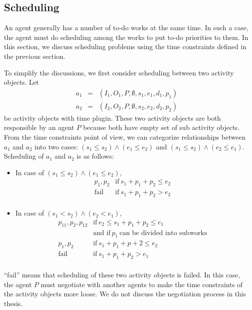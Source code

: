 \subsection{Scheduling}
\label{sec:scheduling}

An agent generally has a number of to-do works at the same time.  In
such a case, the agent must do scheduling among the works to put to-do
priorities to them.  In this section, we discuss scheduling problems
using the time constraints defined in the previous section.

To simplify the discussions, we first consider scheduling between two
activity objects.  Let
\begin{eqnarray*}
 a_1 & = & (I_1, O_1, P, \emptyset, s_1, e_1, d_1, p_1)\\
 a_2 & = & (I_2, O_2, P, \emptyset, s_2, e_2, d_2, p_2)
\end{eqnarray*}
be activity objects with time plugin.  These two activity objects are
both responsible by an agent $P$ because both have empty set of sub
activity objects.  From the time constraints point of view, we can
categorize relationships between $a_1$ and $a_2$ into two cases: $(s_1 \leq
s_2) \wedge (e_1 \leq e_2)$ and $(s_1 \leq s_2) \wedge (e_2 \leq e_1)$.
Scheduling of $a_1$ and $a_2$ is as follows:
\begin{itemize}
 \item In case of $(s_1 \leq s_2) \wedge (e_1 \leq e_2)$, 
       \[
	\begin{array}{ll}
	 p_1, p_2 & \mbox{if}\ s_1 + p_1 + p_2 \leq e_2 \\
	 \mbox{fail} & \mbox{if}\ s_1 + p_1 +p_2 > e_2 \\
	\end{array}
       \]
 \item In case of $(s_1 < s_2) \wedge (e_2 < e_1)$,
       \[
        \begin{array}{ll}
	 p_{11}, p_2, p_{12} & \mbox{if}\ e_2 \leq s_1 + p_1 + p_2 \leq e_1 \\
	 & \mbox{and if}\ p_1\ \mbox{can be divided into subworks}\\
	 p_1, p_2 & \mbox{if}\ s_1 + p_1 + p+2 \leq e_2\\
	 \mbox{fail} & \mbox{if}\ s_1 + p_1 + p_2 > e_1\\
	\end{array}
       \]
\end{itemize}
``fail'' means that scheduling of these two activity objects is failed.
In this case, the agent $P$ must negotiate with another agents to make
the time constraints of the activity objects more loose.  We do not discuss
the negotiation process in this thesis.

